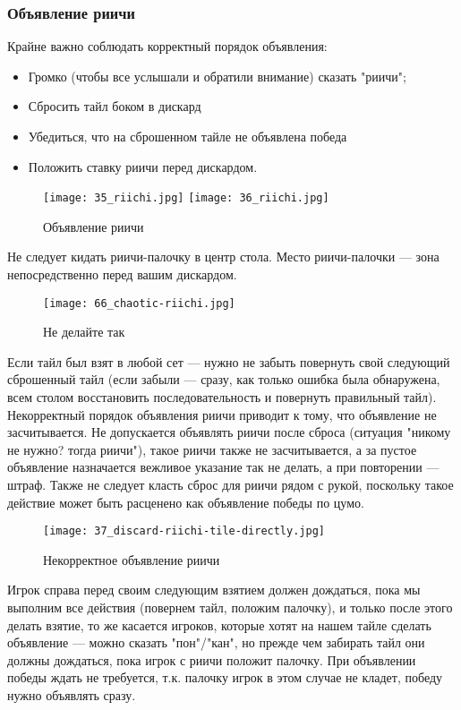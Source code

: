 \subsubsection{Объявление риичи}

Крайне важно соблюдать корректный порядок объявления: 
\begin{itemize}
	\item Громко (чтобы все услышали и обратили внимание) сказать "риичи";
	\item Сбросить тайл боком в дискард
	\item Убедиться, что на сброшенном тайле не объявлена победа
	\item Положить ставку риичи перед дискардом.
\end{itemize}

\begin{figure}[H]
	\centering
	\texttt{[image: 35\_riichi.jpg]}
	\texttt{[image: 36\_riichi.jpg]}
	\caption{Объявление риичи}
\end{figure}

\newpage

Не следует кидать риичи-палочку в центр стола. Место риичи-палочки --- зона непосредственно перед вашим дискардом. 

\begin{figure}[H]
	\centering
	\texttt{[image: 66\_chaotic-riichi.jpg]}
	\caption{Не делайте так}
\end{figure}

Если тайл был взят в любой сет --- нужно не забыть повернуть свой следующий сброшенный тайл (если забыли --- сразу, как только ошибка была обнаружена, всем столом восстановить последовательность и повернуть правильный тайл). Некорректный порядок объявления риичи приводит к тому, что объявление не засчитывается. Не допускается объявлять риичи после сброса (ситуация "никому не нужно? тогда риичи"), такое риичи также не засчитывается, а за пустое объявление назначается вежливое указание так не делать, а при повторении --- штраф. Также не следует класть сброс для риичи рядом с рукой, поскольку такое действие может быть расценено как объявление победы по цумо.

\begin{figure}[H]
	\centering
	\texttt{[image: 37\_discard-riichi-tile-directly.jpg]}
	\caption{Некорректное объявление риичи}
\end{figure}

Игрок справа перед своим следующим взятием должен дождаться, пока мы выполним все действия (повернем тайл, положим палочку), и только после этого делать взятие, то же касается игроков, которые хотят на нашем тайле сделать объявление --- можно сказать "пон"/"кан", но прежде чем забирать тайл они должны дождаться, пока игрок с риичи положит палочку. При объявлении победы ждать не требуется, т.к. палочку игрок в этом случае не кладет, победу нужно объявлять сразу.

